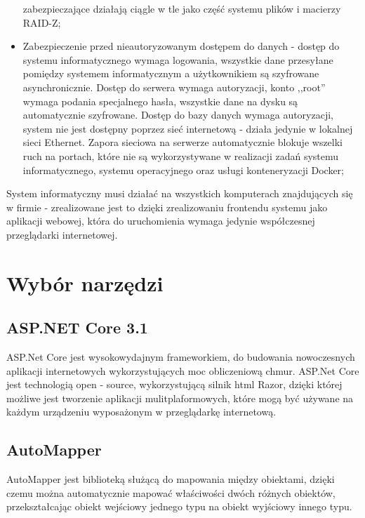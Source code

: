 \documentclass[12pt,a4paper]{article}
\begin{document}
\begin{itemize}
					zabezpieczające działają ciągle w tle jako część systemu plików i macierzy RAID-Z;
				\item Zabezpieczenie przed nieautoryzowanym dostępem do danych - dostęp do systemu informatycznego wymaga logowania, wszystkie dane przesyłane pomiędzy systemem informatycznym
					a użytkownikiem są szyfrowane asynchronicznie. Dostęp do serwera wymaga autoryzacji, konto ,,root'' wymaga podania specjalnego hasła, wszystkie dane na dysku
					są automatycznie szyfrowane. Dostęp do bazy danych wymaga autoryzacji, system nie jest dostępny poprzez sieć internetową - działa jedynie w lokalnej sieci Ethernet.
					Zapora sieciowa na serwerze automatycznie blokuje wszelki ruch na portach, które nie są wykorzystywane w realizacji zadań systemu informatycznego, systemu operacyjnego
					oraz usługi konteneryzacji Docker;
			\end{itemize}
		\indent System informatyczny musi działać na wszystkich komputerach znajdujących się w firmie - zrealizowane jest to dzięki zrealizowaniu frontendu systemu jako aplikacji
				webowej, która do uruchomienia wymaga jedynie współczesnej przeglądarki internetowej.		
	\newpage
	
	\section{Wybór narzędzi}
		\subsection{ASP.NET Core 3.1}
			\indent ASP.Net Core jest wysokowydajnym frameworkiem, do budowania nowoczesnych aplikacji internetowych wykorzystujących moc obliczeniową chmur. ASP.Net Core jest technologią
			open - source, wykorzystującą silnik html Razor, dzięki której możliwe jest tworzenie aplikacji mulitplaformowych, które mogą być używane na każdym urządzeniu wyposażonym
			w przeglądarkę internetową.

		\subsection{AutoMapper}
			\indent AutoMapper jest biblioteką służącą do mapowania między obiektami, dzięki czemu można automatycznie mapować właściwości dwóch różnych obiektów,
					przekształcając obiekt wejściowy jednego typu na obiekt wyjściowy innego typu.  
\end{document}
